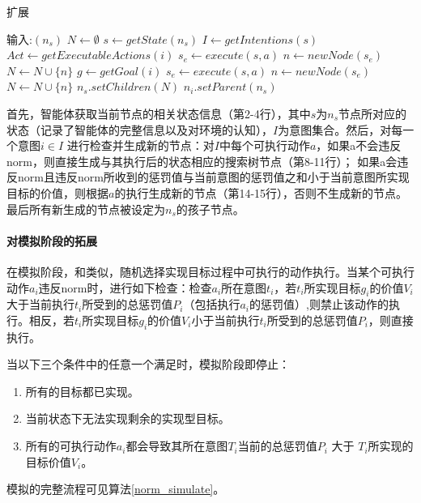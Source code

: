 \begin{algorithm}
\caption{扩展}\label{norm_expand}
\begin{algorithmic}[1]
\STATE 输入:$(n_s)$
      \STATE $N \gets \emptyset$
      \STATE $s \gets getState(n_s)$
      \STATE $I \gets getIntentions(s)$
        \STATE $Act \gets getExecutableActions(i)$
            \STATE $s_e \gets execute(s, a)$
            \STATE $n \gets newNode(s_e)$
            \STATE $N \gets N \cup \{n\}$
            \STATE $g \gets getGoal(i)$
            \STATE $s_e \gets execute(s, a)$
            \STATE $n \gets newNode(s_e)$
            \STATE $N \gets N \cup \{n\}$
          \ENDIF
        \ENDFOR
      \ENDFOR
    \STATE $n_s.setChildren(N)$
    \STATE $n_i.setParent(n_s)$
    \ENDFOR
\end{algorithmic}
\end{algorithm}
%
首先，智能体获取当前节点的相关状态信息（第2-4行），其中$s$为$n_s$节点所对应的状态（记录了智能体的完整信息以及对环境的认知），$I$为意图集合。然后，对每一个意图$i \in  I$ 进行检查并生成新的节点：对$I$中每个可执行动作$a$，如果a不会违反norm，则直接生成与其执行后的状态相应的搜索树节点（第8-11行）； 如果a会违反norm且违反norm所收到的惩罚值与当前意图的惩罚值之和小于当前意图所实现目标的价值，则根据$a$的执行生成新的节点（第14-15行），否则不生成新的节点。 最后所有新生成的节点被设定为$n_s$的孩子节点。

\paragraph{对模拟阶段的拓展}
在模拟阶段，\SAN 和\SA 类似，随机选择实现目标过程中可执行的动作执行。当某个可执行动作$a_i$违反norm时，进行如下检查：检查$a_i$所在意图$t_i$，若$t_i$所实现目标$g_i$的价值$V_i$大于当前执行$t_i$所受到的总惩罚值$P_i$（包括执行$a_i$的惩罚值）,则禁止该动作的执行。相反，若$t_i$所实现目标$g_i$的价值$V_i$小于当前执行$t_i$所受到的总惩罚值$P_i$，则直接执行。

当以下三个条件中的任意一个满足时，模拟阶段即停止：
\begin{enumerate}
  \item 所有的目标都已实现。
  \item 当前状态下无法实现剩余的实现型目标。
  \item 所有的可执行动作$a_i$都会导致其所在意图$T_i$当前的总惩罚值$P_i$ 大于 $T_i$所实现的目标价值$V_i$。
\end{enumerate}
模拟的完整流程可见算法\ref{norm_simulate}。

